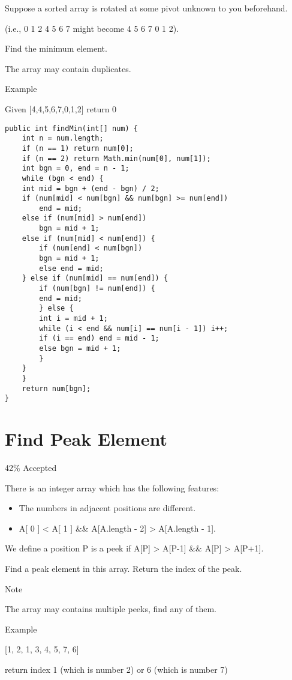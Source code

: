 \documentclass[12pt]{book}
\begin{document}
Suppose a sorted array is rotated at some pivot unknown to you beforehand.

(i.e., 0 1 2 4 5 6 7 might become 4 5 6 7 0 1 2).

Find the minimum element.

The array may contain duplicates.

Example

Given [4,4,5,6,7,0,1,2] return 0
\lstset{language=java,label= ,caption= ,numbers=none}
\begin{lstlisting}
public int findMin(int[] num) {
    int n = num.length;
    if (n == 1) return num[0];
    if (n == 2) return Math.min(num[0], num[1]);
    int bgn = 0, end = n - 1;
    while (bgn < end) {
	int mid = bgn + (end - bgn) / 2;
	if (num[mid] < num[bgn] && num[bgn] >= num[end])
	    end = mid;
	else if (num[mid] > num[end])
	    bgn = mid + 1;
	else if (num[mid] < num[end]) {
	    if (num[end] < num[bgn])
		bgn = mid + 1;
	    else end = mid;
	} else if (num[mid] == num[end]) {
	    if (num[bgn] != num[end]) {
		end = mid;
	    } else {
		int i = mid + 1;
		while (i < end && num[i] == num[i - 1]) i++;
		if (i == end) end = mid - 1;
		else bgn = mid + 1;
	    }
	}
    }
    return num[bgn];
}
\end{lstlisting}
\chapter{Find Peak Element}
\label{sec-28}

42\% Accepted

There is an integer array which has the following features:

\begin{itemize}
\item The numbers in adjacent positions are different.

\item A[ 0 ] < A[ 1 ] \&\& A[A.length - 2] > A[A.length - 1].
\end{itemize}

We define a position P is a peek if A[P] > A[P-1] \&\& A[P] > A[P+1].

Find a peak element in this array. Return the index of the peak.

Note

The array may contains multiple peeks, find any of them.

Example

[1, 2, 1, 3, 4, 5, 7, 6]

return index 1 (which is number 2)  or 6 (which is number 7)
\end{document}
